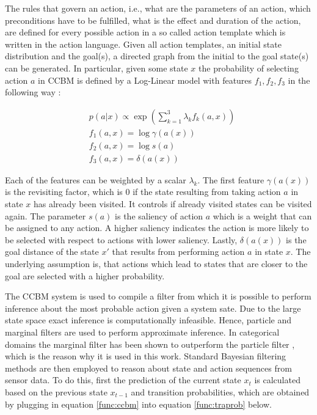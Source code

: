 \documentclass[11pt,titlepage,oneside,openany]{book}
\begin{document}
The rules that govern an action, i.e., what are the parameters of an action, which preconditions have to be fulfilled, what is the effect and duration of the action, are defined for every possible action in a so called action template which is written in the action language. Given all action templates, an initial state distribution and the goal(s), a directed graph from the initial to the goal state(s) can be generated. In particular, given some state $x$ the probability of selecting action $a$ in CCBM is defined by a Log-Linear model with features $f_1, f_2, f_3$ in the following way \cite{rueda_combining_2019}:

\begin{align}
	&p(a|x) \propto 	\exp(\sum_{k=1}^{3} \lambda_k f_k(a,x)) \label{func:ccbm} \\
	&f_1(a,x) = 		\log \gamma(a(x)) \\
	&f_2(a,x) = 		\log s(a) \\
	&f_3(a,x) = 		\delta(a(x))
\end{align}

\noindent Each of the features can be weighted by a scalar $\lambda_k$. The first feature $\gamma(a(x))$ is the revisiting factor, which is 0 if the state resulting from taking action $a$ in state $x$ has already been visited. It controls if already visited states can be visited again. The parameter $s(a)$ is the saliency of action $a$ which is a weight that can be assigned to any action. A higher saliency indicates the action is more likely to be selected with respect to actions with lower saliency. Lastly, $\delta(a(x))$ is the goal distance of the state $x'$ that results from performing action $a$ in state $x$. The underlying assumption is, that actions which lead to states that are closer to the goal are selected with a higher probability.

The CCBM system is used to compile a filter from which it is possible to perform inference about the most probable action given a system sate. Due to the large state space exact inference is computationally infeasible. Hence, particle and marginal filters are used to perform approximate inference. In categorical domains the marginal filter has been shown to outperform the particle filter \cite{kruger_computational_2014}, which is the reason why it is used in this work. Standard Bayesian filtering methods are then employed to reason about state and action sequences from sensor data. To do this, first the prediction of the current state $x_t$ is calculated based on the previous state $x_{t-1}$ and transition probabilities, which are obtained by plugging in equation \ref{func:ccbm} into equation \ref{func:traprob} below.
\end{document}
